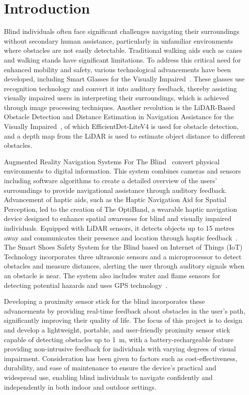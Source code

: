 \documentclass[12pt, a4paper]{article}
\begin{document}
\section{Introduction}

Blind individuals often face significant challenges navigating their surroundings without secondary
human assistance, particularly in unfamiliar environments where obstacles are not easily detectable.
Traditional walking aids such as canes and walking stands have significant limitations. To address this
critical need for enhanced mobility and safety, various technological advancements have been developed,
including Smart Glasses for the Visually Impaired~\cite{ali2016smart}. These glasses use recognition
technology and convert it into auditory feedback, thereby assisting visually impaired users in
interpreting their surroundings, which is achieved through image processing techniques. Another
revolution is the LiDAR-Based Obstacle Detection and Distance Estimation in Navigation Assistance
for the Visually Impaired~\cite{lidar2020}, of which EfficientDet-LiteV4 is used for obstacle detection,
and a depth map from the LiDAR is used to estimate object distance to different obstacles.

Augmented Reality Navigation Systems For The Blind~\cite{kuriakose2021navigation} convert physical
environments to digital information. This system combines cameras and sensors including software
algorithms to create a detailed overview of the users' surroundings to provide navigational assistance
through auditory feedback. Advancement of haptic aids, such as the Haptic Navigation Aid for Spatial
Perception, led to the creation of The OptiBand, a wearable haptic navigation device designed to
enhance spatial awareness for blind and visually impaired individuals. Equipped with LiDAR sensors,
it detects objects up to 15 metres away and communicates their presence and location through haptic
feedback~\cite{ojeda2023optiband}. The Smart Shoes Safety System for the Blind based on Internet of
Things (IoT) Technology incorporates three ultrasonic sensors and a microprocessor to detect obstacles
and measure distances, alerting the user through auditory signals when an obstacle is near. The system
also includes water and flame sensors for detecting potential hazards and uses GPS
technology~\cite{almomani2023smart}.

Developing a proximity sensor stick for the blind incorporates these advancements by providing
real-time feedback about obstacles in the user's path, significantly improving their quality of life. The
focus of this project is to design and develop a lightweight, portable, and user-friendly proximity sensor
stick capable of detecting obstacles up to 1~m, with a battery-rechargeable feature providing
non-intrusive feedback for individuals with varying degrees of visual impairment. Consideration has
been given to factors such as cost-effectiveness, durability, and ease of maintenance to ensure the
device's practical and widespread use, enabling blind individuals to navigate confidently and
independently in both indoor and outdoor settings.
\end{document}
